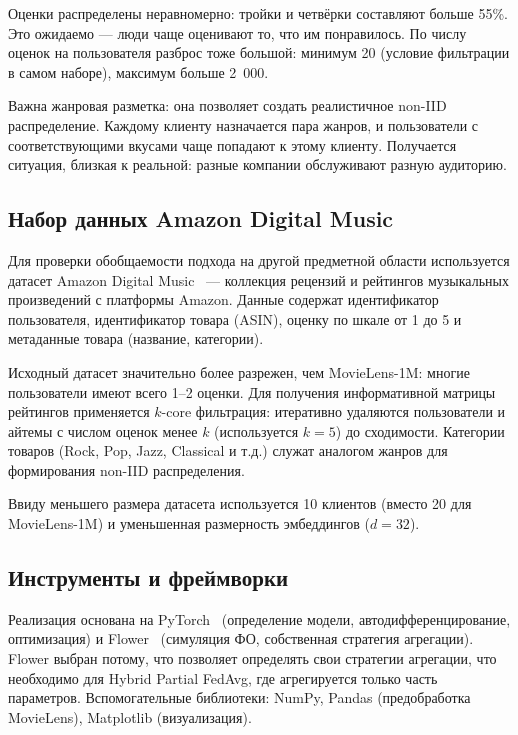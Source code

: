 \documentclass[14pt,a4paper]{extarticle}
\begin{document}
Оценки распределены неравномерно: тройки и четвёрки составляют больше 55\%. Это ожидаемо --- люди чаще оценивают то, что им понравилось. По числу оценок на пользователя разброс тоже большой: минимум 20 (условие фильтрации в самом наборе), максимум больше 2~000.

Важна жанровая разметка: она позволяет создать реалистичное non-IID распределение. Каждому клиенту назначается пара жанров, и пользователи с соответствующими вкусами чаще попадают к этому клиенту. Получается ситуация, близкая к реальной: разные компании обслуживают разную аудиторию.


\subsection{Набор данных Amazon Digital Music}

Для проверки обобщаемости подхода на другой предметной области используется датасет Amazon Digital Music~\cite{ni2019justifying} --- коллекция рецензий и рейтингов музыкальных произведений с платформы Amazon. Данные содержат идентификатор пользователя, идентификатор товара (ASIN), оценку по шкале от 1 до 5 и метаданные товара (название, категории).

Исходный датасет значительно более разрежен, чем MovieLens-1M: многие пользователи имеют всего 1--2 оценки. Для получения информативной матрицы рейтингов применяется $k$-core фильтрация: итеративно удаляются пользователи и айтемы с числом оценок менее $k$ (используется $k = 5$) до сходимости. Категории товаров (Rock, Pop, Jazz, Classical и т.д.) служат аналогом жанров для формирования non-IID распределения.

Ввиду меньшего размера датасета используется 10 клиентов (вместо 20 для MovieLens-1M) и уменьшенная размерность эмбеддингов ($d = 32$).


\subsection{Инструменты и фреймворки}

Реализация основана на PyTorch~\cite{paszke2019pytorch} (определение модели, автодифференцирование, оптимизация) и Flower~\cite{beutel2020flower} (симуляция ФО, собственная стратегия агрегации). Flower выбран потому, что позволяет определять свои стратегии агрегации, что необходимо для Hybrid Partial FedAvg, где агрегируется только часть параметров. Вспомогательные библиотеки: NumPy, Pandas (предобработка MovieLens), Matplotlib (визуализация).
\end{document}
